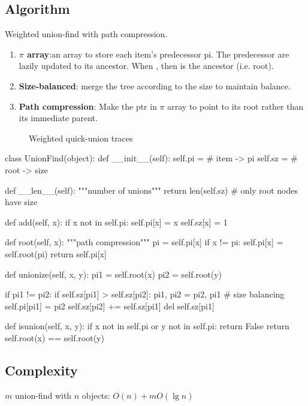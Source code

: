 \subsection{Algorithm}
Weighted union-find with path compression.\\
\begin{enumerate}
\item \textbf{$\pi$ array}:an array to store each item's predecessor pi. The predecessor are lazily updated to its ancestor. When , then  is the ancestor (i.e. root).
\item \textbf{Size-balanced}: merge the tree according to the size to maintain balance.
\item \textbf{Path compression}: Make the ptr in $\pi$ array to point to its root rather than its immediate parent. 
\end{enumerate}
\begin{figure}[]
\centering
\subfloat{\texttt{[image: uf]}}
\caption{Weighted quick-union traces}
\label{fig:union_find}
\end{figure}

\newpage
\begin{python}
class UnionFind(object):
  def __init__(self):
    self.pi = {}  # item -> pi
    self.sz = {}  # root -> size

  def __len__(self):
    """number of unions"""
    return len(self.sz)  # only root nodes have size

  def add(self, x):
    if x not in self.pi:
      self.pi[x] = x
      self.sz[x] = 1

  def root(self, x):
    """path compression"""
    pi = self.pi[x]
    if x != pi:
      self.pi[x] = self.root(pi)
    return self.pi[x]

  def unionize(self, x, y):
    pi1 = self.root(x)
    pi2 = self.root(y)

    if pi1 != pi2:
      if self.sz[pi1] > self.sz[pi2]:
        pi1, pi2 = pi2, pi1
        # size balancing
      self.pi[pi1] = pi2
      self.sz[pi2] += self.sz[pi1]
      del self.sz[pi1]
    
  def isunion(self, x, y):
    if x not in self.pi or y not in self.pi:
      return False 
    return self.root(x) == self.root(y)
\end{python}

\subsection{Complexity}
$m$ union-find with $n$ objects: $O(n)+m O(\lg n)$


